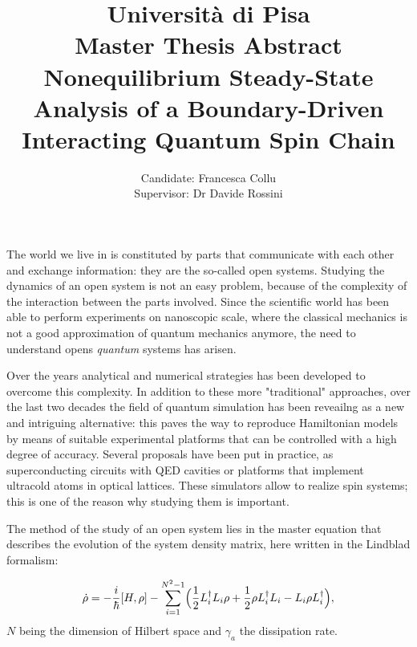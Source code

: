 \documentclass[12pt]{extarticle}
\title{{\normalsize{Università di Pisa}}\\{\normalsize{Master Thesis Abstract}}\\[1cm]\textbf{Nonequilibrium Steady-State Analysis of a Boundary-Driven Interacting Quantum Spin Chain}}
\author{Candidate: Francesca Collu\\{Supervisor: Dr Davide Rossini}}
\date{}
\begin{document}
\maketitle

The world we live in is constituted by parts that communicate with each other and exchange information: they are the so-called open systems. Studying the dynamics of an open system is not an easy problem, because of the complexity of the interaction between the parts involved. Since the scientific world has been able to perform experiments on nanoscopic scale, where the classical mechanics is not a good approximation of quantum mechanics anymore, the need to understand opens \emph{quantum} systems has arisen.

Over the years analytical and numerical strategies has been developed to overcome this complexity. In addition to these more "traditional" approaches, over the last two decades the field of quantum simulation has been reveailng as a new and intriguing alternative: this paves the way to reproduce Hamiltonian models by means of suitable experimental platforms that can be controlled with a high degree of accuracy. Several proposals have been put in practice, as superconducting circuits with QED cavities or platforms that implement ultracold atoms in optical lattices. These simulators allow to realize spin systems; this is one of the reason why studying them is important.

The method of the study of an open system lies in the master equation that describes the evolution of the system density matrix, here written in the Lindblad formalism:

\begin{equation*}
    \dot{\rho} = -\frac{i}{\hbar}[H, \rho] - \sum_{i=1}^{N^2-1} \Bigl(\frac{1}{2}L_i^{\dagger}L_i\rho + \frac{1}{2}\rho L_i^{\dagger}L_i - L_i\rho L_i^{\dagger}\Bigl),
\end{equation*}
$N$ being the dimension of Hilbert space and $\gamma_a$ the dissipation rate.

\end{document}
